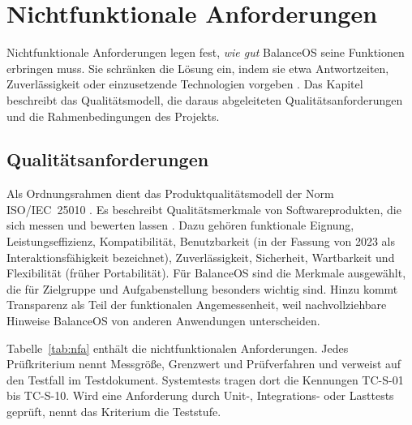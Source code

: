 \section{Nichtfunktionale Anforderungen}\label{sec:nfa}
Nichtfunktionale Anforderungen legen fest, \emph{wie gut} BalanceOS seine Funktionen erbringen muss. Sie schränken die Lösung ein, indem sie etwa Antwortzeiten, Zuverlässigkeit oder einzusetzende Technologien vorgeben \parencite[S.~1-4]{swebok2026}. Das Kapitel beschreibt das Qualitätsmodell, die daraus abgeleiteten Qualitätsanforderungen und die Rahmenbedingungen des Projekts.

\subsection{Qualitätsanforderungen}
Als Ordnungsrahmen dient das Produktqualitätsmodell der Norm \acs{ISO}/\acs{IEC}~25010 \parencite[Abschn.~4.2]{iso25010}. Es beschreibt Qualitätsmerkmale von Softwareprodukten, die sich messen und bewerten lassen \parencite[S.~12-11]{swebok2026}. Dazu gehören funktionale Eignung, Leistungseffizienz, Kompatibilität, Benutzbarkeit (in der Fassung von 2023 als Interaktionsfähigkeit bezeichnet), Zuverlässigkeit, Sicherheit, Wartbarkeit und Flexibilität (früher Portabilität). Für BalanceOS sind die Merkmale ausgewählt, die für Zielgruppe und Aufgabenstellung besonders wichtig sind. Hinzu kommt Transparenz als Teil der funktionalen Angemessenheit, weil nachvollziehbare Hinweise BalanceOS von anderen Anwendungen unterscheiden.

Tabelle~\ref{tab:nfa} enthält die nichtfunktionalen Anforderungen. Jedes Prüfkriterium nennt Messgröße, Grenzwert und Prüfverfahren und verweist auf den Testfall im Testdokument. Systemtests tragen dort die Kennungen TC-S-01 bis TC-S-10. Wird eine Anforderung durch Unit-, Integrations- oder Lasttests geprüft, nennt das Kriterium die Teststufe.

